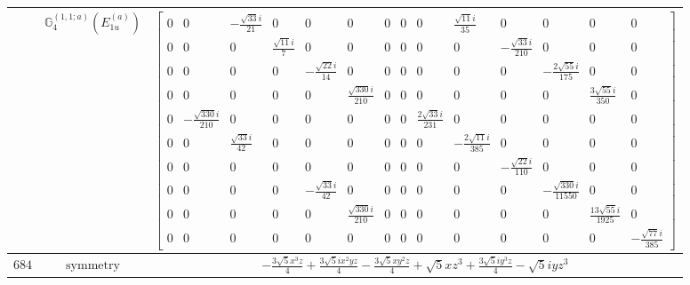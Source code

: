 \documentclass[fleqn,8pt,landscape]{jsarticle}
\begin{document}
\begin{longtable}{ccc}
$  $ & $ \mathbb{G}_{4}^{(1,1;a)}(E_{1u}^{(a)}) $ & $ \begin{bmatrix} 0 & 0 & - \frac{\sqrt{33} i}{21} & 0 & 0 & 0 & 0 & 0 & 0 & \frac{\sqrt{11} i}{35} & 0 & 0 & 0 & 0 \\ 0 & 0 & 0 & \frac{\sqrt{11} i}{7} & 0 & 0 & 0 & 0 & 0 & 0 & - \frac{\sqrt{33} i}{210} & 0 & 0 & 0 \\ 0 & 0 & 0 & 0 & - \frac{\sqrt{22} i}{14} & 0 & 0 & 0 & 0 & 0 & 0 & - \frac{2 \sqrt{55} i}{175} & 0 & 0 \\ 0 & 0 & 0 & 0 & 0 & \frac{\sqrt{330} i}{210} & 0 & 0 & 0 & 0 & 0 & 0 & \frac{3 \sqrt{55} i}{350} & 0 \\ 0 & - \frac{\sqrt{330} i}{210} & 0 & 0 & 0 & 0 & 0 & 0 & \frac{2 \sqrt{33} i}{231} & 0 & 0 & 0 & 0 & 0 \\ 0 & 0 & \frac{\sqrt{33} i}{42} & 0 & 0 & 0 & 0 & 0 & 0 & - \frac{2 \sqrt{11} i}{385} & 0 & 0 & 0 & 0 \\ 0 & 0 & 0 & 0 & 0 & 0 & 0 & 0 & 0 & 0 & - \frac{\sqrt{22} i}{110} & 0 & 0 & 0 \\ 0 & 0 & 0 & 0 & - \frac{\sqrt{33} i}{42} & 0 & 0 & 0 & 0 & 0 & 0 & - \frac{\sqrt{330} i}{11550} & 0 & 0 \\ 0 & 0 & 0 & 0 & 0 & \frac{\sqrt{330} i}{210} & 0 & 0 & 0 & 0 & 0 & 0 & \frac{13 \sqrt{55} i}{1925} & 0 \\ 0 & 0 & 0 & 0 & 0 & 0 & 0 & 0 & 0 & 0 & 0 & 0 & 0 & - \frac{\sqrt{77} i}{385} \end{bmatrix} $ \\ \hline
$ 684 $ & $ \text{symmetry} $ & $ - \frac{3 \sqrt{5} x^{3} z}{4} + \frac{3 \sqrt{5} i x^{2} y z}{4} - \frac{3 \sqrt{5} x y^{2} z}{4} + \sqrt{5} x z^{3} + \frac{3 \sqrt{5} i y^{3} z}{4} - \sqrt{5} i y z^{3} $ \\

\end{longtable}
\end{document}
